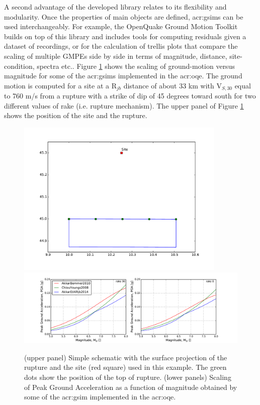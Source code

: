 A second advantage of the developed library relates to its flexibility 
and modularity. Once the properties of main objects are defined, 
\glspl{acr:gsim} can be used interchangeably. 
%
For example, the OpenQuake Ground Motion Toolkit 
\parencite{weatherill2014} builds on top of this library and 
includes tools for computing residuals given a dataset 
of recordings, or for the calculation of trellis plots that compare the scaling of multiple GMPEs side by side in terms of magnitude, distance, site-condition, spectra etc..
%
Figure \ref{fig:gsim_mag_scaling} shows the scaling of ground-motion 
versus magnitude for some of the \glspl{acr:gsim} implemented in the 
\gls{acr:oqe}.
%
The ground motion is computed for a site at a R$_{jb}$ distance of 
about 33 km with V$_{S,30}$ equal to 760 m/s from a rupture with a 
strike of dip of 45 degrees toward south for two different values 
of rake (i.e. rupture mechanism). The upper panel of Figure 
\ref{fig:gsim_mag_scaling} shows the position of the site and 
the rupture.
\begin{figure}[hb]
\centering
\includegraphics[width=10cm]{./Pictures/gsim/rupture_plot.pdf}
\includegraphics[trim = 23mm 0mm 23mm 5mm, clip, width=\textwidth]
    {./Pictures/gsim/mag_scaling_example.pdf}
    \caption{
        (upper panel)
        Simple schematic with the surface projection of the 
        rupture and the site (red square) used in this example. 
        The green dots show the position of the top of rupture.
        (lower panels)
        Scaling of Peak Ground Acceleration as a function 
        of magnitude obtained by some of the \gls{acr:gsim} 
        implemented in the \gls{acr:oqe}. 
    }
\label{fig:gsim_mag_scaling}
\end{figure}
%

